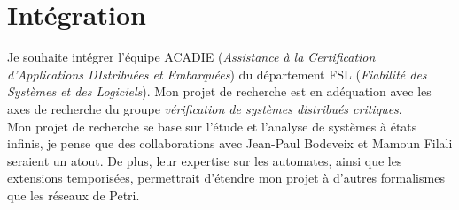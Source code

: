 









\vspace{10pt}
\section*{Intégration}
\vspace{10pt}

Je souhaite intégrer l'équipe ACADIE (\emph{Assistance à la Certification
d’Applications DIstribuées et Embarquées}) du département FSL (\emph{Fiabilité
des Systèmes et des Logiciels}). Mon projet de recherche est en adéquation avec
les axes de recherche du groupe \emph{vérification de systèmes distribués
critiques}.\\

Mon projet de recherche se base sur l'étude et l'analyse de systèmes à états
infinis, je pense que des collaborations avec Jean-Paul Bodeveix et Mamoun
Filali seraient un atout. De plus, leur expertise sur les automates, ainsi que
les extensions temporisées, permettrait d'étendre mon projet à d'autres
formalismes que les réseaux de Petri.\\

